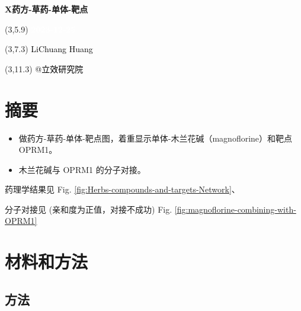 \documentclass[
]{article}
\author{}
\date{\vspace{-2.5em}}
\providecommand{\tightlist}{%
  \setlength{\itemsep}{0pt}\setlength{\parskip}{0pt}}
\begin{document}
\begin{titlepage} 
\begin{center} \textbf{\Huge
X药方-草药-单体-靶点} \vspace{4em}
\begin{textblock}{10}(3,5.9) \huge
\textbf{\textcolor{white}{2023-12-25}}
\end{textblock} \begin{textblock}{10}(3,7.3)
\Large \textcolor{black}{LiChuang Huang}
\end{textblock} \begin{textblock}{10}(3,11.3)
\Large \textcolor{black}{@立效研究院}
\end{textblock} \end{center} \end{titlepage}
\restoregeometry


\tableofcontents

\listoffigures

\listoftables

\newpage


\hypertarget{abstract}{%
\section{摘要}\label{abstract}}

\begin{itemize}
\tightlist
\item
  做药方-草药-单体-靶点图，着重显示单体-木兰花碱（magnoflorine）和靶点OPRM1。
\item
  木兰花碱与 OPRM1 的分子对接。
\end{itemize}

药理学结果见 Fig. \ref{fig:Herbs-compounds-and-targets-Network}、

分子对接见 (亲和度为正值，对接不成功) Fig. \ref{fig:magnoflorine-combining-with-OPRM1}

\hypertarget{methods}{%
\section{材料和方法}\label{methods}}

\hypertarget{ux65b9ux6cd5}{%
\subsection{方法}\label{ux65b9ux6cd5}}
\end{document}
